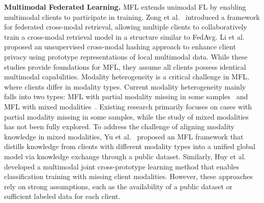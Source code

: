 \noindent\textbf{Multimodal Federated Learning.} MFL extends unimodal FL by enabling multimodal clients to participate in training. Zong et al.~\cite{zong2021fedcmr} introduced a framework for federated cross-modal retrieval, allowing multiple clients to collaboratively train a cross-modal retrieval model in a structure similar to FedAvg.
Li et al.~\cite{li2023prototype} proposed an unsupervised cross-modal hashing approach to enhance client privacy using prototype representations of local multimodal data. 
While these studies provide foundations for MFL, they assume all clients possess identical multimodal capabilities. Modality heterogeneity is a critical challenge in MFL, where clients differ in modality types. 
Current modality heterogeneity mainly falls into two types: MFL with partial modality missing in some samples~\cite{xiong2023client,bao2023multimodal} and MFL with mixed modalities~\cite{peng2024fedmm,le2024cross}.
Existing research primarily focuses on cases with partial modality missing in some samples, while the study of mixed modalities has not been fully explored. To address the challenge of aligning modality knowledge in mixed modalities, Yu et al.~\cite{yu2023multimodal} proposed an MFL framework that distills knowledge from clients with different modality types into a unified global model via knowledge exchange through a public dataset. Similarly, Huy et al.~\cite{le2024cross} developed a multimodal joint cross-prototype learning method that enables classification training with missing client modalities. However, these approaches rely on strong assumptions, such as the availability of a public dataset or sufficient labeled data for each client.
